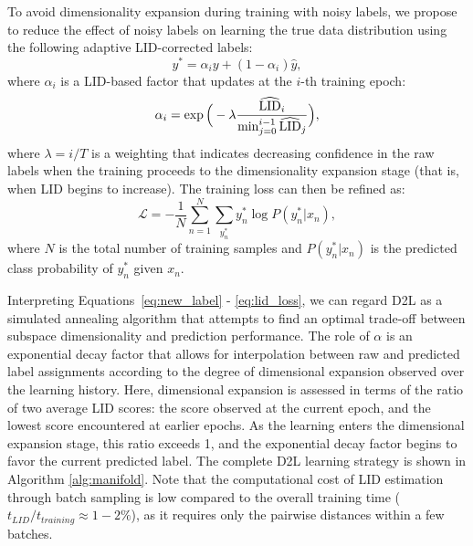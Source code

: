 \documentclass{article}
\begin{document}
To avoid dimensionality expansion during training with noisy labels, we propose to reduce the effect of noisy labels on learning the true data distribution using the following adaptive LID-corrected labels:
\begin{equation} \label{eq:new_label}
    y^{*} = \alpha_i y + (1 - \alpha_i) \widehat y,
\end{equation}
where $\alpha_i$ is a LID-based factor that updates at the $i$-th training epoch:
\begin{equation} \label{eq:pace}
   \alpha_{i} = \exp \Big(- \lambda \frac{\widehat{\textup{LID}}_{i}}{\min_{j=0}^{i-1} \widehat{\textup{LID}}_{j}}\Big),
\end{equation}
where $\lambda=i / T$ is a weighting that indicates decreasing confidence in the raw labels when the training proceeds to the dimensionality expansion stage (that is, when LID begins to increase). The training loss can then be refined as:
\begin{equation} \label{eq:lid_loss}
\mathcal{L} = - \frac{1}{N}\sum_{n = 1}^{N} \sum_{y_n^*} y_n^* \log P(y_n^*|x_n),
\end{equation}
where $N$ is the total number of training samples and $P(y_n^*|x_n)$ is the predicted class probability of $y_n^*$ given $x_n$. 

Interpreting Equations~\eqref{eq:new_label} - \eqref{eq:lid_loss}, we can regard D2L as a simulated annealing algorithm that attempts to find an optimal trade-off between subspace dimensionality and prediction performance. The role of $\alpha$ is an exponential decay factor that allows for interpolation between raw and predicted label assignments according to the degree of dimensional expansion observed over the learning history. Here, dimensional expansion is assessed in terms of the ratio of two average LID scores: the score observed at the current epoch, and the lowest score encountered at earlier epochs. As the learning enters the dimensional expansion stage, this ratio exceeds 1, and the exponential decay factor begins to favor the current predicted label. The complete D2L learning strategy is shown in Algorithm \ref{alg:manifold}. 
Note that the computational cost of LID estimation through batch sampling is low compared to the overall training time ($t_{LID}/t_{training} \approx 1 - 2\%$), as it requires only the pairwise distances within a few batches.
\end{document}
